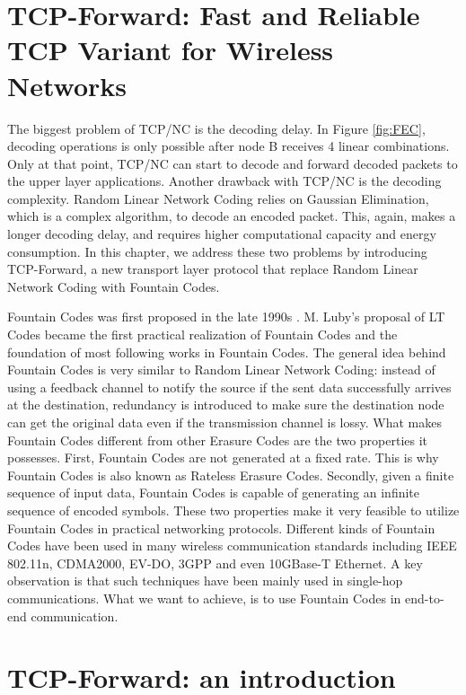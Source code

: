 \documentclass[10pt, conference, final, letterpaper]{IEEEtran}
\theoremstyle{definition}
\begin{document}
\section{TCP-Forward: Fast and Reliable TCP Variant for Wireless Networks}
\label{chapter:TCPLT}

The biggest problem of TCP/NC is the decoding delay. In Figure \ref{fig:FEC}, decoding operations is only possible after node B receives 4 linear combinations. Only at that point, TCP/NC can start to decode and forward decoded packets to the upper layer applications. Another drawback with TCP/NC is the decoding complexity. Random Linear Network Coding relies on Gaussian Elimination, which is a complex algorithm, to decode an encoded packet. This, again, makes a longer decoding delay, and requires higher computational capacity and energy consumption. In this chapter, we address these two problems by introducing TCP-Forward, a new transport layer protocol that replace Random Linear Network Coding with Fountain Codes.

Fountain Codes was first proposed in the late 1990s \cite{fountain}. M. Luby's proposal of LT Codes \cite{ltcodes} became the first practical realization of Fountain Codes and the foundation of most following works in Fountain Codes. The general idea behind Fountain Codes is very similar to Random Linear Network Coding: instead of using a feedback channel to notify the source if the sent data successfully arrives at the destination, redundancy is introduced to make sure the destination node can get the original data even if the transmission channel is lossy. What makes Fountain Codes different from other Erasure Codes are the two properties it possesses. First, Fountain Codes are not generated at a fixed rate. This is why Fountain Codes is also known as Rateless Erasure Codes. Secondly, given a finite sequence of input data, Fountain Codes is capable of generating an infinite sequence of encoded symbols. These two properties make it very feasible to utilize Fountain Codes in practical networking protocols. Different kinds of Fountain Codes have been used in many wireless communication standards including IEEE 802.11n, CDMA2000, EV-DO, 3GPP and even 10GBase-T Ethernet. A key observation is that such techniques have been mainly used in single-hop communications. What we want to achieve, is to use Fountain Codes in end-to-end communication.

\section{TCP-Forward: an introduction}
\label{section:TCP-Forward}
\end{document}
